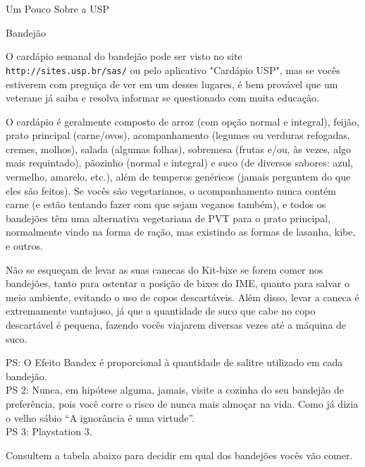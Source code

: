 \begin{secao}{Um Pouco Sobre a USP}
\begin{subsecao}{Bandejão}

O cardápio semanal do bandejão pode ser visto no site {\tt
http://sites.usp.br/sas/} ou pelo aplicativo "Cardápio USP", mas se vocês
estiverem com preguiça de ver em um desses lugares, é
bem provável que um veterane já saiba e resolva informar se questionado com muita
educação.

O cardápio é geralmente composto de arroz (com opção normal e integral), feijão,
prato principal (carne/ovos), acompanhamento (legumes ou verduras refogadas,
cremes, molhos), salada (algumas folhas), sobremesa (frutas e/ou, às vezes, algo mais
requintado), pãozinho (normal e integral) e suco (de diversos sabores: azul, vermelho,
amarelo, etc.), além de temperos genéricos
(jamais perguntem do que eles são feitos). Se vocês são vegetarianos, o
acompanhamento nunca contém carne (e estão tentando fazer com que sejam veganos
também), e todos os bandejões têm uma alternativa vegetariana de PVT para o
prato principal, normalmente vindo na forma de ração, mas existindo as formas
de lasanha, kibe, e outros.


Não se esqueçam de levar as suas canecas do Kit-bixe se forem comer nos
bandejões, tanto para ostentar a posição de bixes do IME, quanto para salvar o
meio ambiente, evitando o uso de copos descartáveis. Além disso, levar a caneca
é extremamente vantajoso, já que a quantidade de suco que cabe no copo
descartável é pequena, fazendo vocês viajarem diversas vezes até a máquina de
suco.

PS: O Efeito Bandex é proporcional à quantidade de salitre utilizado em cada
bandejão.\\
PS 2: Nunca, em hipótese alguma, jamais, visite a cozinha do seu bandejão de
preferência, pois você corre o risco de nunca mais almoçar na vida. Como já
dizia o velho sábio ``A ignorância é uma virtude''.\\
PS 3: Playstation 3.

Consultem a tabela abaixo para decidir em qual dos bandejões vocês vão comer.


\end{subsecao}
\end{secao}
